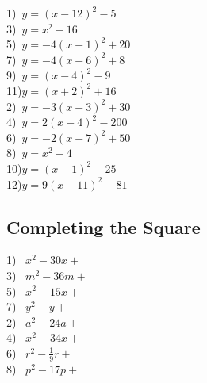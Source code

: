 \begin{multicols}{2}
  1)~$y=(x-12)^2-5 $\\
  3)~$y=x^2-16$\\
  5)~$y=-4(x-1)^2+20$\\
  7)~$y=-4(x+6)^2+8$\\
  9)~$y=(x-4)^2-9$\\
  11)$y=(x+2)^2+16$\\
  2)~$y=-3(x-3)^2+30 $\\
  4)~$y=2(x-4)^2 -200 $\\
  6)~$y=-2(x-7)^2+50$\\
  8)~$y=x^2-4$\\
  10)$y=(x-1)^2-25 $\\
  12)$y=9(x-11)^2-81$
\end{multicols}

\newpage

\subsection{Completing the Square}

{}

\begin{multicols}{2}
  1)~ $x^2 - 30 x +$~\underline{\hspace{.5in}}\\
  3)~ $m^2 - 36 m +$~\underline{\hspace{.5in}}\\
  5)~ $x^2 - 15 x +$~\underline{\hspace{.5in}}\\
  7)~ $y^2 - y +$~\underline{\hspace{.5in}}\\
  2)~ $a^2 - 24 a +$~\underline{\hspace{.5in}}\\
  4)~ $x^2 - 34 x +$~\underline{\hspace{.5in}}\\
  6)~ $r^2 - \frac{1}{9} r +$~\underline{\hspace{.5in}}\\
  8)~ $p^2 - 17 p +$~\underline{\hspace{.5in}}
\end{multicols}

{}

